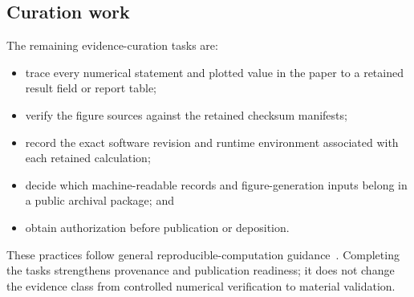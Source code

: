 \subsection{Curation work}

The remaining evidence-curation tasks are:
\begin{itemize}
 \item[$\square$] trace every numerical statement and plotted value in the
 paper to a retained result field or report table;
 \item[$\square$] verify the figure sources against the retained checksum
 manifests;
 \item[$\square$] record the exact software revision and runtime environment
 associated with each retained calculation;
 \item[$\square$] decide which machine-readable records and figure-generation
 inputs belong in a public archival package; and
 \item[$\square$] obtain authorization before publication or deposition.
\end{itemize}
These practices follow general reproducible-computation guidance~\cite{sandve2013}.
Completing the tasks strengthens provenance and publication readiness; it does
not change the evidence class from controlled numerical verification to
material validation.
